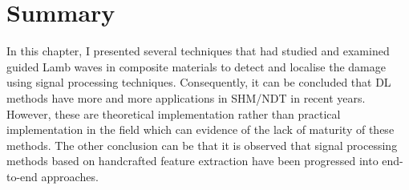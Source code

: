 \section{Summary}
\label{sec34}
In this chapter, I presented several techniques that had studied and examined guided Lamb waves in composite materials to detect and localise the damage using signal processing techniques. 
Consequently, it can be concluded that DL methods have more and more applications in SHM/NDT in recent years. 
However, these are theoretical implementation rather than practical implementation in the field which can evidence of the lack of maturity of these methods. 
The other conclusion can be that it is observed that signal processing methods based on handcrafted feature extraction have been progressed into end-to-end approaches.
 
%
%

